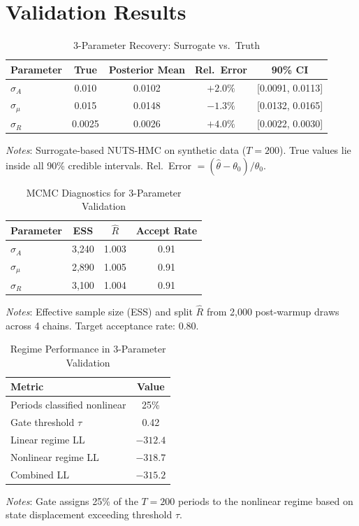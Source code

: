 \documentclass[12pt]{article}
\theoremstyle{plain}
\theoremstyle{definition}
\theoremstyle{remark}
\begin{document}
\section{Validation Results}
\label{app:validation_results}

\begin{table}[htbp]
\centering
\caption{3-Parameter Recovery: Surrogate vs.\ Truth}
\label{tab:param_recovery}
\begin{tabular}{lcccc}
\toprule
Parameter & True & Posterior Mean & Rel.\ Error & 90\% CI \\
\midrule
$\sigma_A$ & 0.010 & 0.0102 & $+2.0\%$ & [0.0091, 0.0113] \\
$\sigma_\mu$ & 0.015 & 0.0148 & $-1.3\%$ & [0.0132, 0.0165] \\
$\sigma_R$ & 0.0025 & 0.0026 & $+4.0\%$ & [0.0022, 0.0030] \\
\bottomrule
\end{tabular}
\smallskip
{\footnotesize \textit{Notes}: Surrogate-based NUTS-HMC on synthetic data ($T=200$). True values lie inside all 90\% credible intervals. Rel.\ Error $= (\hat{\theta} - \theta_0)/\theta_0$.}
\end{table}

\begin{table}[htbp]
\centering
\caption{MCMC Diagnostics for 3-Parameter Validation}
\label{tab:mcmc_diagnostics}
\begin{tabular}{lccc}
\toprule
Parameter & ESS & $\hat{R}$ & Accept Rate \\
\midrule
$\sigma_A$ & 3,240 & 1.003 & 0.91 \\
$\sigma_\mu$ & 2,890 & 1.005 & 0.91 \\
$\sigma_R$ & 3,100 & 1.004 & 0.91 \\
\bottomrule
\end{tabular}
\smallskip
{\footnotesize \textit{Notes}: Effective sample size (ESS) and split $\hat{R}$ from 2,000 post-warmup draws across 4 chains. Target acceptance rate: 0.80.}
\end{table}

\begin{table}[htbp]
\centering
\caption{Regime Performance in 3-Parameter Validation}
\label{tab:regime_performance}
\begin{tabular}{lc}
\toprule
Metric & Value \\
\midrule
Periods classified nonlinear & 25\% \\
Gate threshold $\tau$ & 0.42 \\
Linear regime LL & $-312.4$ \\
Nonlinear regime LL & $-318.7$ \\
Combined LL & $-315.2$ \\
\bottomrule
\end{tabular}
\smallskip
{\footnotesize \textit{Notes}: Gate assigns 25\% of the $T=200$ periods to the nonlinear regime based on state displacement exceeding threshold $\tau$.}
\end{table}
\end{document}
